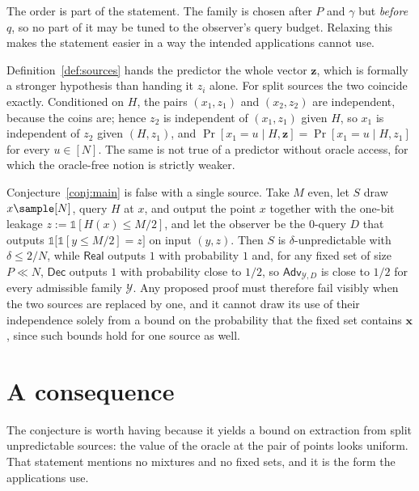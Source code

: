 \documentclass{conjura-conjecture}
\newcommand{\Adv}{\mathsf{Adv}}
\newcommand{\Real}{\mathsf{Real}}
\newcommand{\Dec}{\mathsf{Dec}}
\newcommand{\Prob}[1]{\Pr\!\left[#1\right]}
\newcommand{\vx}{\mathbf{x}}
\newcommand{\vz}{\mathbf{z}}
\newcommand{\ind}{\mathbb{1}}
\begin{document}
\begin{remark}\label{rem:order}
The order is part of the statement. The family is chosen after $P$ and
$\gamma$ but \emph{before} $q$, so no part of it may be tuned to the
observer's query budget. Relaxing this makes the statement easier in a way
the intended applications cannot use.
\end{remark}

\begin{remark}\label{rem:vecz}
Definition~\ref{def:sources} hands the predictor the whole vector $\vz$,
which is formally a stronger hypothesis than handing it $z_i$ alone. For
split sources the two coincide exactly. Conditioned on $H$, the pairs
$(x_1,z_1)$ and $(x_2,z_2)$ are independent, because the coins are; hence
$z_2$ is independent of $(x_1,z_1)$ given $H$, so $x_1$ is independent of
$z_2$ given $(H,z_1)$, and
$\Prob{x_1 = u \mid H,\vz} = \Prob{x_1 = u \mid H,z_1}$ for every
$u \in [N]$. The same is not true of a predictor without oracle access, for
which the oracle-free notion is strictly weaker.
\end{remark}

\begin{remark}\label{rem:ell1}
Conjecture~\ref{conj:main} is false with a single source. Take $M$ even,
let $S$ draw $x \sample [N]$, query $H$ at $x$, and output the point $x$
together with the one-bit leakage $z := \ind[H(x) \le M/2]$, and let the
observer be the $0$-query $D$ that outputs $\ind\bigl[\ind[y \le M/2] =
z\bigr]$ on input $(y,z)$. Then $S$ is $\delta$-unpredictable with
$\delta \le 2/N$, while $\Real$ outputs $1$ with probability $1$ and, for
any fixed set of size $P \ll N$, $\Dec$ outputs $1$ with probability close
to $1/2$, so $\Adv_{\mathcal{Y},D}$ is close to $1/2$ for every admissible
family $\mathcal{Y}$. Any proposed proof must
therefore fail visibly when the two sources are replaced by one, and it
cannot draw its use of their independence solely from a bound on the
probability that the fixed set contains $\vx$, since such bounds hold for
one source as well.
\end{remark}


\section{A consequence}\label{sec:consequence}

The conjecture is worth having because it yields a bound on extraction from
split unpredictable sources: the value of the oracle at the pair of points
looks uniform. That statement mentions no mixtures and no fixed sets, and
it is the form the applications use.
\end{document}
